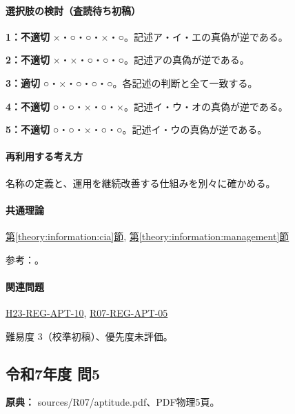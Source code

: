\paragraph{選択肢の検討（査読待ち初稿）}\mbox{}\par

\noindent\textbf{1：不適切} ×・○・○・×・○。記述ア・イ・エの真偽が逆である。\par

\noindent\textbf{2：不適切} ×・×・○・○・○。記述アの真偽が逆である。\par

\noindent\textbf{3：適切} ○・×・○・○・○。各記述の判断と全て一致する。\par

\noindent\textbf{4：不適切} ○・○・×・○・×。記述イ・ウ・オの真偽が逆である。\par

\noindent\textbf{5：不適切} ○・○・×・○・○。記述イ・ウの真偽が逆である。\par

\paragraph{再利用する考え方} 名称の定義と、運用を継続改善する仕組みを別々に確かめる。

\paragraph{共通理論} \hyperref[theory:information:cia]{第\ref*{theory:information:cia}節}, \hyperref[theory:information:management]{第\ref*{theory:information:management}節}

\par 参考：\cite{iso27000_2009}。

\paragraph{関連問題} \hyperref[q:h23-reg-apt-10]{H23-REG-APT-10}, \hyperref[q:r07-reg-apt-05]{R07-REG-APT-05}

\par 難易度 3（校準初稿）、優先度未評価。

\subsection{令和7年度 問5}
\label{q:r07-reg-apt-05}

\noindent\textbf{原典：} sources/R07/aptitude.pdf、PDF物理5頁。

